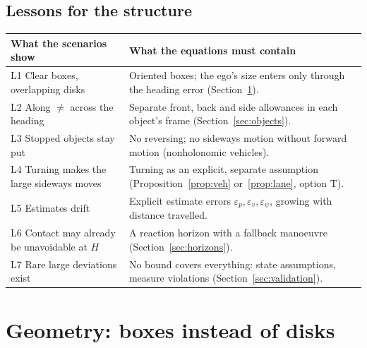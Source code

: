 \documentclass[11pt]{article}
\theoremstyle{definition}
\theoremstyle{remark}
\begin{document}
\subsection{Lessons for the structure}\label{sec:lessons}
\begin{center}
\begin{tabular}{p{6.4cm}p{8.4cm}}
\toprule
What the scenarios show & What the equations must contain \\
\midrule
L1 Clear boxes, overlapping disks & Oriented boxes; the ego's size enters only through the heading error (Section~\ref{sec:geometry}). \\
L2 Along $\ne$ across the heading & Separate front, back and side allowances in each object's frame (Section~\ref{sec:objects}). \\
L3 Stopped objects stay put & No reversing; no sideways motion without forward motion (nonholonomic vehicles). \\
L4 Turning makes the large sideways moves & Turning as an explicit, separate assumption (Proposition~\ref{prop:veh} or~\ref{prop:lane}, option T). \\
L5 Estimates drift & Explicit estimate errors $\varepsilon_p,\varepsilon_v,\varepsilon_\psi$, growing with distance travelled. \\
L6 Contact may already be unavoidable at $H$ & A reaction horizon with a fallback manoeuvre (Section~\ref{sec:horizons}). \\
L7 Rare large deviations exist & No bound covers everything: state assumptions, measure violations (Section~\ref{sec:validation}). \\
\bottomrule
\end{tabular}
\end{center}

\section{Geometry: boxes instead of disks}\label{sec:geometry}
\end{document}
